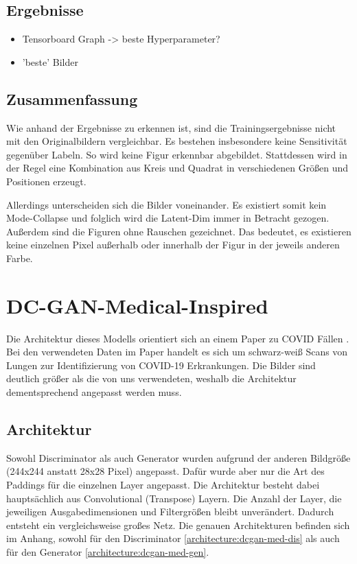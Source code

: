 \subsection{Ergebnisse}
\begin{itemize}
	\item Tensorboard Graph -> beste Hyperparameter?
	\item 'beste' Bilder
\end{itemize}

\subsection{Zusammenfassung}
Wie anhand der Ergebnisse zu erkennen ist, sind die Trainingsergebnisse nicht mit den Originalbildern vergleichbar.
Es bestehen insbesondere keine Sensitivität gegenüber Labeln.
So wird keine Figur erkennbar abgebildet.
Stattdessen wird in der Regel eine Kombination aus Kreis und Quadrat in verschiedenen Größen und Positionen erzeugt.
\newline

Allerdings unterscheiden sich die Bilder voneinander.
Es existiert somit kein Mode-Collapse und folglich wird die Latent-Dim immer in Betracht gezogen.
Außerdem sind die Figuren ohne Rauschen gezeichnet.
Das bedeutet, es existieren keine einzelnen Pixel außerhalb oder innerhalb der Figur in der jeweils anderen Farbe.

\section{DC-GAN-Medical-Inspired}

Die Architektur dieses Modells orientiert sich an einem Paper zu COVID Fällen \cite{inspiration-dc-gan-med}.
Bei den verwendeten Daten im Paper handelt es sich um schwarz-weiß Scans von Lungen zur Identifizierung von COVID-19 Erkrankungen.
Die Bilder sind deutlich größer als die von uns verwendeten, weshalb die Architektur dementsprechend angepasst werden muss.

\subsection{Architektur}
Sowohl Discriminator als auch Generator wurden aufgrund der anderen Bildgröße (244x244 anstatt 28x28 Pixel) angepasst.
Dafür wurde aber nur die Art des Paddings für die einzelnen Layer angepasst.
Die Architektur besteht dabei hauptsächlich aus Convolutional (Transpose) Layern.
Die Anzahl der Layer, die jeweiligen Ausgabedimensionen und Filtergrößen bleibt unverändert.
Dadurch entsteht ein vergleichsweise großes Netz.
Die genauen Architekturen befinden sich im Anhang, sowohl für den Discriminator \cref{architecture:dcgan-med-dis} als auch für den Generator \cref{architecture:dcgan-med-gen}.

